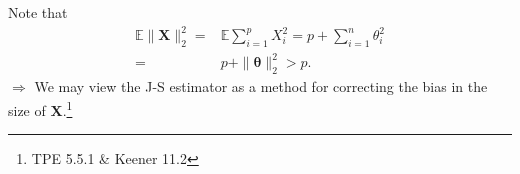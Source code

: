 \begin{note}
    Note that
    \begin{align}
        \mathbb{E}\|\boldsymbol{X}\|_2^2
        =& \mathbb{E}\sum_{i=1}^pX_i^2
        = p + \sum_{i=1}^n{\theta_i^2}\\
        =& p + \|\boldsymbol{\theta}\|_2^2 > p.
    \end{align}
    $\Rightarrow$ We may view the J-S estimator as a method 
    for correcting the bias in the size of $\boldsymbol{X}$.\footnote{TPE 5.5.1 \& Keener 11.2}
\end{note}

\newpage